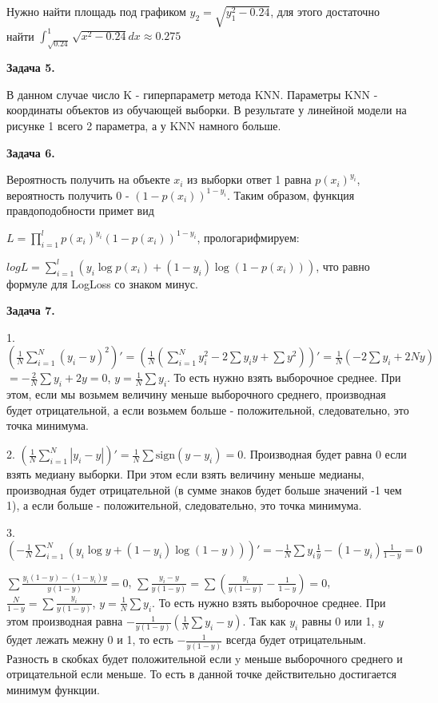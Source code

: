 \documentclass{article}
\begin{document}
    Нужно найти площадь под графиком $y_2=\sqrt{y_1^2-0.24}$, для этого достаточно найти
    $\int_{\sqrt{0.24}}^1\sqrt{x^2-0.24}dx\approx 0.275$

    \textbf {Задача 5.}

    В данном случае число K - гиперпараметр метода KNN\@.
    Параметры KNN - координаты объектов из обучающей выборки.
    В результате у линейной модели на рисунке 1 всего 2 параметра, а у KNN намного больше.

    \textbf {Задача 6.}

    Вероятность получить на объекте $x_i$ из выборки ответ 1 равна $p(x_i)^{y_i}$, вероятность получить 0 - $(1-p(x_i))^{1-y_i}$.
    Таким образом, функция правдоподобности примет вид

    $L=\prod_{i=1}^l p(x_i)^{y_i}(1-p(x_i))^{1-y_i}$, прологарифмируем:

    $logL=\sum_{i=1}^l (y_i \log{p(x_i)}+(1-y_i)\log(1-p(x_i)))$, что равно формуле для LogLoss со знаком минус.

    \textbf {Задача 7.}

    1. $(\frac{1}{N}\sum_{i=1}^N(y_i-y)^2)'=(\frac{1}{N}(\sum_{i=1}^N y_i^2-2\sum y_i y+\sum y^2))'=\frac{1}{N}(-2\sum y_i+2Ny)$
    $=-\frac{2}{N}\sum y_i+2y=0$,
    $y=\frac{1}{N}\sum y_i$.
    То есть нужно взять выборочное среднее.
    При этом, если мы возьмем величину меньше выборочного среднего, производная будет отрицательной, а если возьмем больше - положительной, следовательно, это точка минимума.

    2. $(\frac{1}{N}\sum_{i=1}^N |y_i-y|)'=\frac{1}{N}\sum \mathrm{sign}(y-y_i)=0$.
    Производная будет равна 0 если взять медиану выборки.
    При этом если взять величину меньше медианы, производная будет отрицательной (в сумме знаков будет больше значений -1 чем 1), а если больше - положительной, следовательно, это точка минимума.

    3. $(-\frac{1}{N}\sum_{i=1}^N (y_i\log{y}+(1-y_i)\log(1-y)))'=-\frac{1}{N}\sum y_i \frac{1}{y}-(1-y_i)\frac{1}{1-y}=0$

    $\sum \frac{y_i(1-y)-(1-y_i)y}{y(1-y)}=0$, $\sum\frac{y_i -y}{y(1-y)}=\sum(\frac{y_i}{y(1-y)}-\frac{1}{1-y})=0$,
    $\frac{N}{1-y}=\sum\frac{y_i}{y(1-y)}$, $y=\frac{1}{N}\sum y_i$.
    То есть нужно взять выборочное среднее.
    При этом производная равна $-\frac{1}{y(1-y)}(\frac{1}{N}\sum y_i -y)$.
    Так как $y_i$ равны 0 или 1, $y$ будет лежать межну 0 и 1, то есть $-\frac{1}{y(1-y)}$ всегда будет отрицательным.
    Разность в скобках будет положительной если y меньше выборочного среднего и отрицательной если меньше.
    То есть в данной точке действительно достигается минимум функции.
\end{document}
